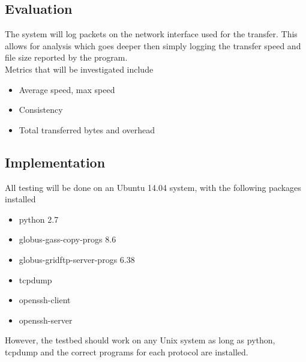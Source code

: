 \documentclass{sig-alternate-05-2015}
\begin{document}
\subsection{Evaluation}
The system will log packets on the network interface used for the transfer. This allows for analysis which goes deeper then simply logging the transfer speed and file size reported by the program.\\
Metrics that will be investigated include
\begin{itemize}
		\item Average speed, max speed
		\item Consistency
		\item Total transferred bytes and overhead
\end{itemize}

\subsection{Implementation}
All testing will be done on an Ubuntu 14.04 system, with the following packages installed
\begin{itemize}
	\item python 2.7
	\item globus-gass-copy-progs 8.6
	\item globus-gridftp-server-progs 6.38
	\item tcpdump
	\item openssh-client
	\item openssh-server
\end{itemize}
However, the testbed should work on any Unix system as long as python, tcpdump and the correct programs for each protocol are installed.
\end{document}
